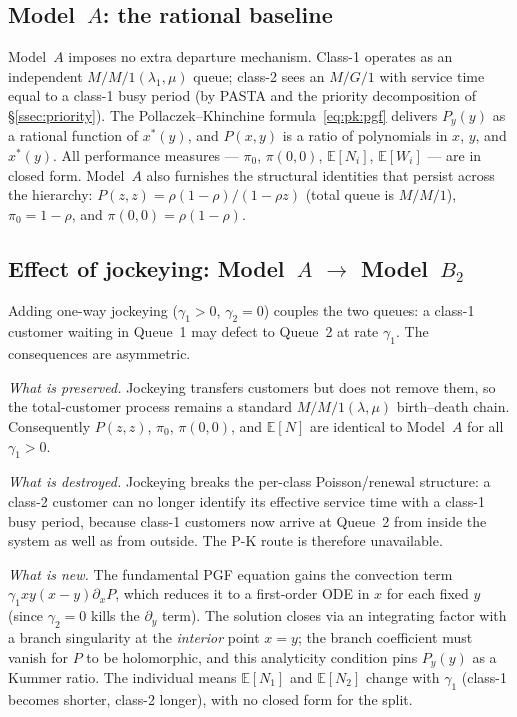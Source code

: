 \subsection*{Model~$A$: the rational baseline}

Model~$A$ imposes no extra departure mechanism.
Class-1 operates as an independent $M/M/1(\lambda_1,\mu)$ queue;
class-2 sees an $M/G/1$ with service time equal to a class-1 busy period
(by PASTA and the priority decomposition of \S\ref{ssec:priority}).
The Pollaczek--Khinchine formula~\eqref{eq:pk:pgf} delivers $P_y(y)$
as a rational function of $x^*(y)$, and $P(x,y)$ is a ratio of polynomials
in $x$, $y$, and $x^*(y)$.  All performance measures --- $\pi_0$, $\pi(0,0)$,
$\mathbb{E}[N_i]$, $\mathbb{E}[W_i]$ --- are in closed form.  Model~$A$ also
furnishes the structural identities that persist across the hierarchy:
$P(z,z)=\rho(1-\rho)/(1-\rho z)$ (total queue is $M/M/1$),
$\pi_0=1-\rho$, and $\pi(0,0)=\rho(1-\rho)$.

\subsection*{Effect of jockeying: Model~$A$ $\to$ Model~$B_2$}

Adding one-way jockeying ($\gamma_1>0$, $\gamma_2=0$) couples the two queues:
a class-1 customer waiting in Queue~1 may defect to Queue~2 at rate $\gamma_1$.
The consequences are asymmetric.

\emph{What is preserved.}
Jockeying transfers customers but does not remove them, so the total-customer
process remains a standard $M/M/1(\lambda,\mu)$ birth--death chain.
Consequently $P(z,z)$, $\pi_0$, $\pi(0,0)$, and $\mathbb{E}[N]$ are identical
to Model~$A$ for all $\gamma_1>0$.

\emph{What is destroyed.}
Jockeying breaks the per-class Poisson/renewal structure: a class-2 customer
can no longer identify its effective service time with a class-1 busy period,
because class-1 customers now arrive at Queue~2 from inside the system as well
as from outside.  The P-K route is therefore unavailable.

\emph{What is new.}
The fundamental PGF equation gains the convection term
$\gamma_1 xy(x-y)\partial_x P$, which reduces it to a first-order ODE in $x$
for each fixed $y$ (since $\gamma_2=0$ kills the $\partial_y$ term).
The solution closes via an integrating factor with a branch singularity at the
\emph{interior} point $x=y$; the branch coefficient must vanish for $P$ to be
holomorphic, and this analyticity condition pins $P_y(y)$ as a Kummer ratio.
The individual means $\mathbb{E}[N_1]$ and $\mathbb{E}[N_2]$ change with
$\gamma_1$ (class-1 becomes shorter, class-2 longer), with no closed form for
the split.

